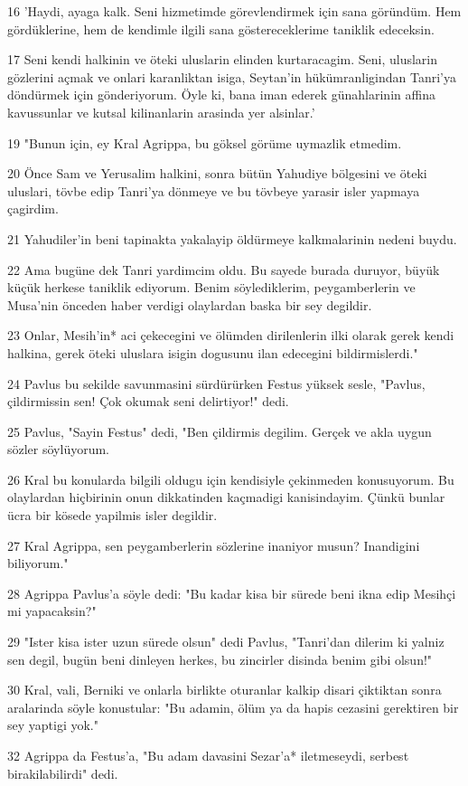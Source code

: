 \par 16 'Haydi, ayaga kalk. Seni hizmetimde görevlendirmek için sana göründüm. Hem gördüklerine, hem de kendimle ilgili sana göstereceklerime taniklik edeceksin.
\par 17 Seni kendi halkinin ve öteki uluslarin elinden kurtaracagim. Seni, uluslarin gözlerini açmak ve onlari karanliktan isiga, Seytan'in hükümranligindan Tanri'ya döndürmek için gönderiyorum. Öyle ki, bana iman ederek günahlarinin affina kavussunlar ve kutsal kilinanlarin arasinda yer alsinlar.'
\par 19 "Bunun için, ey Kral Agrippa, bu göksel görüme uymazlik etmedim.
\par 20 Önce Sam ve Yerusalim halkini, sonra bütün Yahudiye bölgesini ve öteki uluslari, tövbe edip Tanri'ya dönmeye ve bu tövbeye yarasir isler yapmaya çagirdim.
\par 21 Yahudiler'in beni tapinakta yakalayip öldürmeye kalkmalarinin nedeni buydu.
\par 22 Ama bugüne dek Tanri yardimcim oldu. Bu sayede burada duruyor, büyük küçük herkese taniklik ediyorum. Benim söylediklerim, peygamberlerin ve Musa'nin önceden haber verdigi olaylardan baska bir sey degildir.
\par 23 Onlar, Mesih'in* aci çekecegini ve ölümden dirilenlerin ilki olarak gerek kendi halkina, gerek öteki uluslara isigin dogusunu ilan edecegini bildirmislerdi."
\par 24 Pavlus bu sekilde savunmasini sürdürürken Festus yüksek sesle, "Pavlus, çildirmissin sen! Çok okumak seni delirtiyor!" dedi.
\par 25 Pavlus, "Sayin Festus" dedi, "Ben çildirmis degilim. Gerçek ve akla uygun sözler söylüyorum.
\par 26 Kral bu konularda bilgili oldugu için kendisiyle çekinmeden konusuyorum. Bu olaylardan hiçbirinin onun dikkatinden kaçmadigi kanisindayim. Çünkü bunlar ücra bir kösede yapilmis isler degildir.
\par 27 Kral Agrippa, sen peygamberlerin sözlerine inaniyor musun? Inandigini biliyorum."
\par 28 Agrippa Pavlus'a söyle dedi: "Bu kadar kisa bir sürede beni ikna edip Mesihçi mi yapacaksin?"
\par 29 "Ister kisa ister uzun sürede olsun" dedi Pavlus, "Tanri'dan dilerim ki yalniz sen degil, bugün beni dinleyen herkes, bu zincirler disinda benim gibi olsun!"
\par 30 Kral, vali, Berniki ve onlarla birlikte oturanlar kalkip disari çiktiktan sonra aralarinda söyle konustular: "Bu adamin, ölüm ya da hapis cezasini gerektiren bir sey yaptigi yok."
\par 32 Agrippa da Festus'a, "Bu adam davasini Sezar'a* iletmeseydi, serbest birakilabilirdi" dedi.


